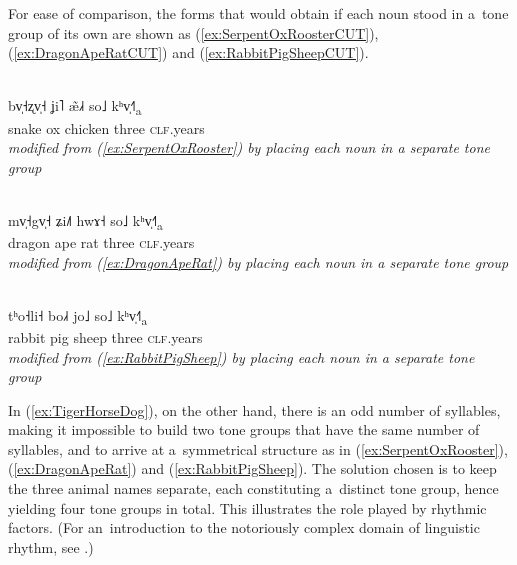 For ease of comparison, the forms that would obtain if each noun stood in a~tone group of its own are shown as (\ref{ex:SerpentOxRoosterCUT}), (\ref{ex:DragonApeRatCUT}) and (\ref{ex:RabbitPigSheepCUT}). 

\begin{exe}
	\ex
	\label{ex:SerpentOxRoosterCUT}
	\\
	\gll bv̩˧ʐv̩˧	ʝi˥	æ̃˩˧	so˩		kʰv̩˧˥\textsubscript{a}\\
	snake		ox	chicken	three	\textsc{clf}.years\\
	\glt \textit{modified from (\ref{ex:SerpentOxRooster}) by placing each noun in a separate tone group}
\end{exe}

\begin{exe}
	\ex
	\label{ex:DragonApeRatCUT}
	\\
	\gll mv̩˧gv̩˧	ʑi˩˥	hwɤ˧	so˩		kʰv̩˧˥\textsubscript{a}\\
	dragon		ape		rat		three	\textsc{clf}.years\\
	\glt \textit{modified from (\ref{ex:DragonApeRat}) by placing each noun in a separate tone group}
\end{exe}

\begin{exe}
	\ex
	\label{ex:RabbitPigSheepCUT}
	\\
	\gll tʰo˧li˧	bo˩˧		jo˩		so˩		kʰv̩˧˥\textsubscript{a}\\
	rabbit		pig			sheep	three	\textsc{clf}.years\\
	\glt \textit{modified from (\ref{ex:RabbitPigSheep}) by placing each noun in a separate tone group}
\end{exe}

In (\ref{ex:TigerHorseDog}), on the other hand, there is an odd number of syllables, making it impossible to build two tone groups that have the same number of syllables, and to arrive at a~symmetrical structure as in (\ref{ex:SerpentOxRooster}), (\ref{ex:DragonApeRat}) and (\ref{ex:RabbitPigSheep}). The solution chosen is to keep the three
animal names separate, each constituting a~distinct tone group, hence yielding four tone
groups in total. This illustrates the role played by rhythmic factors. (For an~introduction to the notoriously complex domain of linguistic rhythm, see \citealt{niebuhr2009b, cummins2012, house2012}.)


